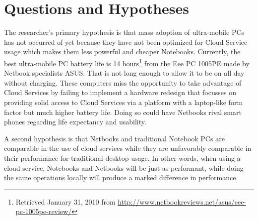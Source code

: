 \section{Questions and Hypotheses}

The researcher's primary hypothesis is that mass adoption of ultra-mobile PCs
has not occurred of yet because they have not been optimized for Cloud Service
usage which makes them less powerful and cheaper Notebooks.  Currently,
the best ultra-mobile PC battery life is 14 hours\footnote{Retrieved January 31, 2010      %
from \url{http://www.netbookreviews.net/asus/eee-pc-1005pe-review/}} from the
Eee PC 1005PE made by Netbook specialists ASUS.  That is not long enough to
allow it to be on all day without charging.  These computers miss the
opportunity to take advantage of Cloud Services by failing to implement a
hardware redesign that focusses on providing solid access to Cloud Services via
a platform with a laptop-like form factor but much higher battery life.  Doing
so could have Netbooks rival smart phones regarding life expectancy and usability.


A second hypothesis is that Netbooks and traditional Notebook PCs are
comparable %
in the use of cloud services while they are unfavorably comparable in their
performance for traditional desktop usage.  In other words, when using a cloud
service, Notebooks and Netbooks will be just as performant, while doing the same
operations locally will produce a marked difference in performance.
